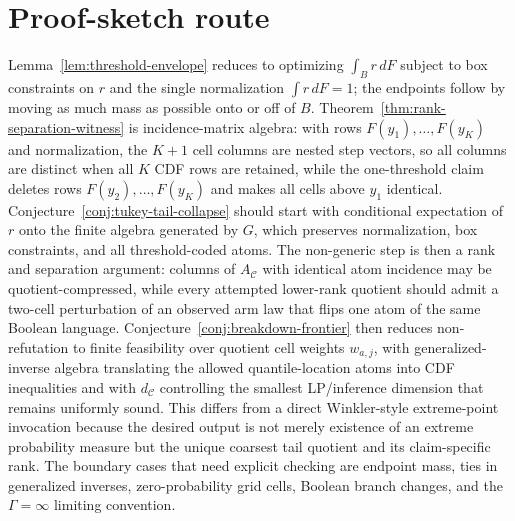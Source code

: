 \documentclass[11pt]{article}
\theoremstyle{definition}
\theoremstyle{plain}
\theoremstyle{remark}
\begin{document}
\section{Proof-sketch route}
Lemma~\ref{lem:threshold-envelope} reduces to optimizing \(\int_B r\,dF\) subject to box constraints on \(r\) and the single normalization \(\int r\,dF=1\); the endpoints follow by moving as much mass as possible onto or off of \(B\).  Theorem~\ref{thm:rank-separation-witness} is incidence-matrix algebra: with rows \(F(y_1),\ldots,F(y_K)\) and normalization, the \(K+1\) cell columns are nested step vectors, so all columns are distinct when all \(K\) CDF rows are retained, while the one-threshold claim deletes rows \(F(y_2),\ldots,F(y_K)\) and makes all cells above \(y_1\) identical.  Conjecture~\ref{conj:tukey-tail-collapse} should start with conditional expectation of \(r\) onto the finite algebra generated by \(G\), which preserves normalization, box constraints, and all threshold-coded atoms.  The non-generic step is then a rank and separation argument: columns of \(A_{\mathcal{C}}\) with identical atom incidence may be quotient-compressed, while every attempted lower-rank quotient should admit a two-cell perturbation of an observed arm law that flips one atom of the same Boolean language.  Conjecture~\ref{conj:breakdown-frontier} then reduces non-refutation to finite feasibility over quotient cell weights \(w_{a,j}\), with generalized-inverse algebra translating the allowed quantile-location atoms into CDF inequalities and with \(d_{\mathcal{C}}\) controlling the smallest LP/inference dimension that remains uniformly sound.  This differs from a direct Winkler-style extreme-point invocation because the desired output is not merely existence of an extreme probability measure but the unique coarsest tail quotient and its claim-specific rank.  The boundary cases that need explicit checking are endpoint mass, ties in generalized inverses, zero-probability grid cells, Boolean branch changes, and the \(\Gamma=\infty\) limiting convention.
\end{document}
